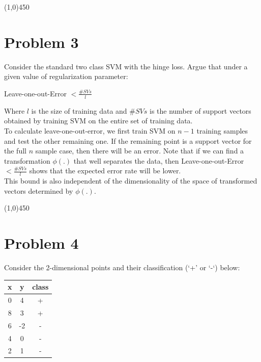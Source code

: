 \documentclass[12pt]{article}
\begin{document}
\begin{center}
\line(1,0){450}
\end{center}

\section{Problem 3}
Consider the standard two class SVM with the hinge loss. Argue that under a given value
of regularization parameter:
\begin{center}
Leave-one-out-Error $< \frac{\#SVs}{l}$
\end{center}
Where $l$ is the size of training data and $\#SVs$ is the number of support vectors obtained by
training SVM on the entire set of training data.
\\
To calculate leave-one-out-error, we first train SVM on $n - 1$ training samples and test the other remaining one. If the remaining point is a support vector for the full $n$ sample case, then there will be an error. Note that if we can find a transformation $\phi(.)$ that well separates the data, then Leave-one-out-Error $< \frac{\#SVs}{l}$ shows that the expected error rate will be lower.\\
This bound is also independent of the dimensionality of the space of transformed vectors determined by $\phi(.)$.

\begin{center}
\line(1,0){450}
\end{center}

\section{Problem 4}
Consider the 2-dimensional points and their classification (‘+’ or ‘-‘) below:

\begin{table}[h]
\centering
\begin{tabular}{| c  c | c |}
\hline
x & y & class \\
\hline 
0 & 4 & + \\
8 & 3 & + \\
6 & -2 & - \\
4 & 0 & - \\
2 & 1 & -\\ \hline
\end{tabular}
\end{table}
\end{document}
